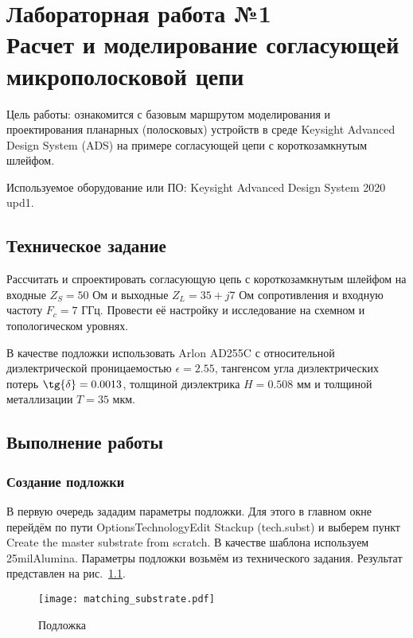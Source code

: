 \chapter{Лабораторная работа №1 \\
Расчет и моделирование согласующей микрополосковой цепи}

Цель работы: ознакомится с базовым маршрутом моделирования и проектирования планарных (полосковых) устройств в среде Keysight Advanced Design System (ADS) на примере согласующей цепи с короткозамкнутым шлейфом.

Используемое оборудование или ПО: Keysight Advanced Design System 2020 upd1.

\section{Техническое задание}

Рассчитать и спроектировать согласующую цепь с короткозамкнутым шлейфом на входные $Z_S = 50\text{~Ом}$ и выходные $Z_L = 35 + j 7 \text{~Ом}$ сопротивления и входную частоту $F_c = 7 \text{~ГГц}$.
Провести её настройку и исследование на схемном и топологическом уровнях.

В качестве подложки использовать Arlon AD255C с относительной диэлектрической проницаемостью $\epsilon = 2.55$, тангенсом угла диэлектрических потерь $\tg{\delta} = 0.0013$, толщиной диэлектрика $H = 0.508 \text{~мм}$ и толщиной металлизации $T = 35 \text{~мкм}$.

\section{Выполнение работы}

\subsection{Создание подложки}

В первую очередь зададим параметры подложки. Для этого в главном окне перейдём по пути Options\textrightarrow Technology\textrightarrow Edit Stackup (tech.subst) и выберем пункт Create the master substrate from scratch. В качестве шаблона используем 25milAlumina. Параметры подложки возьмём из технического задания. Результат представлен на рис.~\ref{fig:matching_substrate}.

\begin{figure}
    \centering
    \texttt{[image: matching\_substrate.pdf]}
    \caption{Подложка}%
    \label{fig:matching_substrate}
\end{figure}


